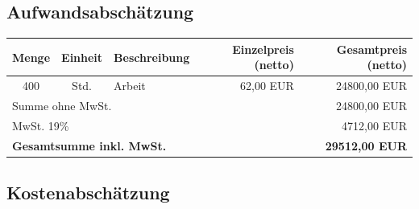\documentclass[a4paper, 11pt]{article} %
\begin{document}
\subsection{Aufwandsabschätzung}

\vspace{5pt}
\begin{tabularx}{\textwidth}{ccXrr}
\hline
\tiny {Menge} & \tiny {Einheit} & \tiny {Beschreibung} & \tiny {Einzelpreis (netto)} & \tiny {Gesamtpreis (netto)} \\ \hline
 400 & Std. & Arbeit & \multicolumn{1}{r}{62,00 EUR} & \multicolumn{1}{r}{24800,00 EUR} \\ \hline \hline
\multicolumn{ 4}{l}{\small{Summe ohne MwSt.}} & 24800,00 EUR \\ \hline
\multicolumn{ 4}{l}{\small{MwSt. 19\% }} & 4712,00 EUR \\ \hline \hline
\multicolumn{ 4}{l}{ \textbf{Gesamtsumme inkl. MwSt.} } & \textbf{29512,00 EUR} \\ \hline
\end{tabularx}


\subsection{Kostenabschätzung}
\end{document}
